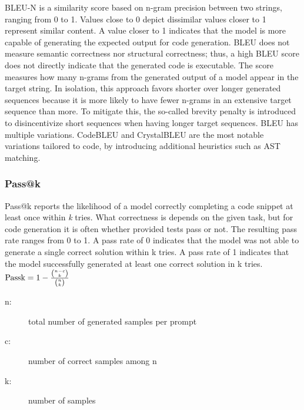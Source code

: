 \documentclass[11pt]{article}
\begin{document}
BLEU-N \cite{DBLP:conf/acl/PapineniRWZ02} is a similarity score based on n-gram precision between two strings, ranging from 0 to 1.
Values close to 0 depict dissimilar values closer to 1 represent similar content.
A value closer to 1 indicates that the model is more capable of generating the expected output for code generation.
BLEU does not measure semantic correctness nor structural correctness; thus, a high BLEU score does not directly indicate that the generated code is executable.
The score measures how many n-grams from the generated output of a model appear in the target string.
In isolation, this approach favors shorter over longer generated sequences because it is more likely to have fewer n-grams in an extensive target sequence than more.
To mitigate this, the so-called brevity penalty is introduced to disincentivize short sequences when having longer target sequences.
BLEU has multiple variations.
CodeBLEU \cite{DBLP:journals/corr/abs-2009-10297} and CrystalBLEU \cite{DBLP:conf/kbse/EghbaliP22} are the most notable variations tailored to code, by introducing additional heuristics such as AST matching.

\subsubsection{Pass@k}
Pass@k reports the likelihood of a model correctly completing a code snippet at least once within \emph{k} tries.
What correctness is depends on the given task, but for code generation it is often whether provided tests pass or not.
The resulting pass rate ranges from 0 to 1.
A pass rate of 0 indicates that the model was not able to generate a single correct solution within k tries.
A pass rate of 1 indicates that the model successfully generated at least one correct solution in k tries.
$\text{Pass\@k} = 1 - \frac{\binom{n-c}{k}}{\binom{n}{k}}$
\begin{description}
    \item[n:] total number of generated samples per prompt
    \item[c:] number of correct samples among  n
    \item[k:] number of samples
\end{description}
\end{document}
